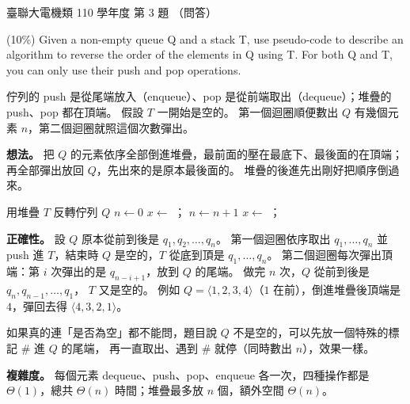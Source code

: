 \begin{pastexam}[label={px:ust-110-ee-ds-03}]{臺聯大電機類 110 學年度 第 3 題}
（問答）

(10\%) Given a non-empty queue Q and a stack T, use pseudo-code to describe an algorithm to reverse the
order of the elements in Q using T. For both Q and T, you can only use their push and pop operations.
\end{pastexam}

\begin{pastsoln}
佇列的 push 是從尾端放入（enqueue）、pop 是從前端取出（dequeue）；堆疊的 push、pop 都在頂端。
假設 $T$ 一開始是空的。 第一個迴圈順便數出 $Q$ 有幾個元素 $n$，第二個迴圈就照這個次數彈出。

\textbf{想法。} 把 $Q$ 的元素依序全部倒進堆疊，最前面的壓在最底下、最後面的在頂端；再全部彈出放回
$Q$，先出來的是原本最後面的。 堆疊的後進先出剛好把順序倒過來。

\begin{pseudo}[unbreakable]{用堆疊 $T$ 反轉佇列 $Q$}
    \State $n \gets 0$
        \State $x \gets$ ；
        \State $n \gets n + 1$
    \EndWhile
        \State $x \gets$ ；
    \EndFor
\EndProcedure
\end{pseudo}

\textbf{正確性。} 設 $Q$ 原本從前到後是 $q_1, q_2, \ldots, q_n$。 第一個迴圈依序取出 $q_1, \ldots, q_n$
並 push 進 $T$，結束時 $Q$ 是空的，$T$ 從底到頂是 $q_1, \ldots, q_n$。 第二個迴圈每次彈出頂端：第
$i$ 次彈出的是 $q_{n-i+1}$，放到 $Q$ 的尾端。 做完 $n$ 次，$Q$ 從前到後是 $q_n, q_{n-1}, \ldots, q_1$，
$T$ 又是空的。 例如 $Q = \langle 1, 2, 3, 4 \rangle$（$1$ 在前），倒進堆疊後頂端是 $4$，彈回去得
$\langle 4, 3, 2, 1 \rangle$。

如果真的連「是否為空」都不能問，題目說 $Q$ 不是空的，可以先放一個特殊的標記 $\#$ 進 $Q$ 的尾端，
再一直取出、遇到 $\#$ 就停（同時數出 $n$），效果一樣。

\textbf{複雜度。} 每個元素 dequeue、push、pop、enqueue 各一次，四種操作都是 $\Theta(1)$，總共
$\Theta(n)$ 時間；堆疊最多放 $n$ 個，額外空間 $\Theta(n)$。
\end{pastsoln}
